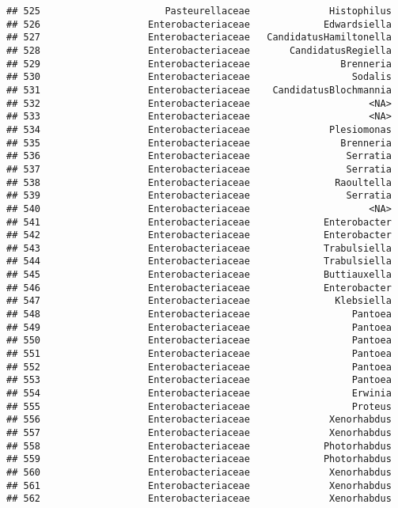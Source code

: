 \documentclass[
]{article}
\begin{document}
\begin{verbatim}
## 525                      Pasteurellaceae              Histophilus
## 526                   Enterobacteriaceae             Edwardsiella
## 527                   Enterobacteriaceae   CandidatusHamiltonella
## 528                   Enterobacteriaceae       CandidatusRegiella
## 529                   Enterobacteriaceae                Brenneria
## 530                   Enterobacteriaceae                  Sodalis
## 531                   Enterobacteriaceae    CandidatusBlochmannia
## 532                   Enterobacteriaceae                     <NA>
## 533                   Enterobacteriaceae                     <NA>
## 534                   Enterobacteriaceae              Plesiomonas
## 535                   Enterobacteriaceae                Brenneria
## 536                   Enterobacteriaceae                 Serratia
## 537                   Enterobacteriaceae                 Serratia
## 538                   Enterobacteriaceae               Raoultella
## 539                   Enterobacteriaceae                 Serratia
## 540                   Enterobacteriaceae                     <NA>
## 541                   Enterobacteriaceae             Enterobacter
## 542                   Enterobacteriaceae             Enterobacter
## 543                   Enterobacteriaceae             Trabulsiella
## 544                   Enterobacteriaceae             Trabulsiella
## 545                   Enterobacteriaceae             Buttiauxella
## 546                   Enterobacteriaceae             Enterobacter
## 547                   Enterobacteriaceae               Klebsiella
## 548                   Enterobacteriaceae                  Pantoea
## 549                   Enterobacteriaceae                  Pantoea
## 550                   Enterobacteriaceae                  Pantoea
## 551                   Enterobacteriaceae                  Pantoea
## 552                   Enterobacteriaceae                  Pantoea
## 553                   Enterobacteriaceae                  Pantoea
## 554                   Enterobacteriaceae                  Erwinia
## 555                   Enterobacteriaceae                  Proteus
## 556                   Enterobacteriaceae              Xenorhabdus
## 557                   Enterobacteriaceae              Xenorhabdus
## 558                   Enterobacteriaceae             Photorhabdus
## 559                   Enterobacteriaceae             Photorhabdus
## 560                   Enterobacteriaceae              Xenorhabdus
## 561                   Enterobacteriaceae              Xenorhabdus
## 562                   Enterobacteriaceae              Xenorhabdus

\end{verbatim}
\end{document}
